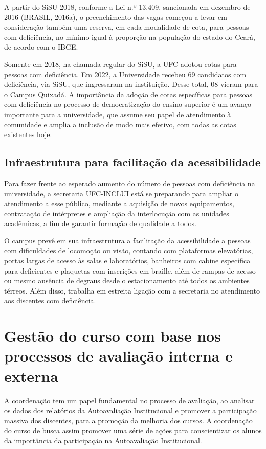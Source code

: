 A partir do SiSU 2018, conforme a Lei n.º 13.409, sancionada em dezembro de 2016 (BRASIL, 2016a), o preenchimento das vagas começou a levar em consideração também uma reserva, em cada modalidade de cota, para pessoas com deficiência, no mínimo igual à proporção na população do estado do Ceará, de acordo com o IBGE.

Somente em 2018, na chamada regular do SiSU, a UFC adotou cotas para pessoas com deficiência. Em 2022, a Universidade recebeu 69 candidatos com deficiência, via SiSU, que ingressaram na instituição. Desse total, 08 vieram para o Campus Quixadá. A importância da adoção de cotas específicas para pessoas com deficiência no processo de democratização do ensino superior é um avanço importante para a universidade, que assume seu papel de atendimento à comunidade e amplia a inclusão de modo mais efetivo, com todas as cotas existentes hoje.


\subsection{Infraestrutura para facilitação da acessibilidade }
Para fazer frente ao esperado aumento do número de pessoas com deficiência na universidade, a secretaria UFC-INCLUI está se preparando para ampliar o atendimento a esse público, mediante a aquisição de novos equipamentos, contratação de intérpretes e ampliação da interlocução com as unidades acadêmicas, a fim de garantir formação de qualidade a todos.

O campus prevê em sua infraestrutura a facilitação da acessibilidade a pessoas com dificuldades de locomoção ou visão, contando com plataformas elevatórias, portas largas de acesso às salas e laboratórios, banheiros com cabine específica para deficientes e plaquetas com inscrições em braille, além de rampas de acesso ou mesmo ausência de degraus desde o estacionamento até todos os ambientes térreos. Além disso, trabalha em estreita ligação com a secretaria no atendimento aos discentes com deficiência.

\section{Gestão do curso com base nos processos de avaliação interna e externa}

A coordenação tem um papel fundamental no processo de avaliação, ao analisar os dados dos relatórios da Autoavaliação Institucional e promover a participação massiva dos discentes, para a promoção da melhoria dos cursos. A coordenação do curso de \nomedocurso busca assim promover uma série de ações para conscientizar os alunos da importância da participação na Autoavaliação Institucional. %

